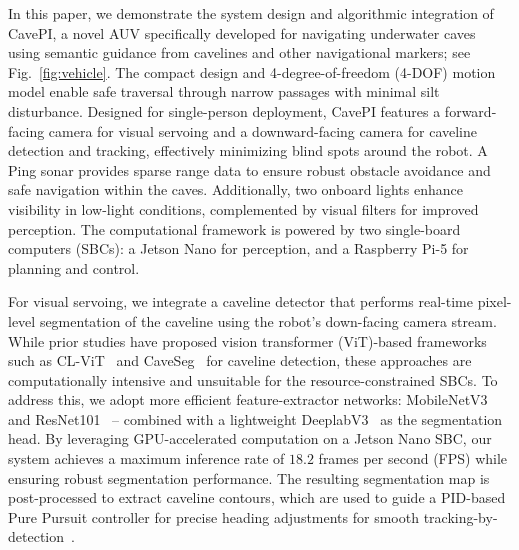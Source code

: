 In this paper, we demonstrate the system design and algorithmic integration of CavePI, a novel AUV specifically developed for navigating underwater caves using semantic guidance from cavelines and other navigational markers; see Fig.~\ref{fig:vehicle}. The compact design and 4-degree-of-freedom (4-DOF) motion model enable safe traversal through narrow passages with minimal silt disturbance. Designed for single-person deployment, CavePI features a forward-facing camera for visual servoing and a downward-facing camera for caveline detection and tracking, effectively minimizing blind spots around the robot. A Ping sonar provides sparse range data to ensure robust obstacle avoidance and safe navigation within the caves. Additionally, two onboard lights enhance visibility in low-light conditions, complemented by visual filters for improved perception. The computational framework is powered by two single-board computers (SBCs): a Jetson Nano for perception, and a Raspberry Pi-5 for planning and control. 



For visual servoing, we integrate a caveline detector that performs real-time pixel-level segmentation of the caveline using the robot's down-facing camera stream. While prior studies have proposed vision transformer (ViT)-based frameworks such as CL-ViT~\cite{yu2023weakly} and CaveSeg~\cite{abdullah2023caveseg} for caveline detection, these approaches are computationally intensive and unsuitable for the resource-constrained SBCs. To address this, we adopt more efficient feature-extractor networks: MobileNetV3~\cite{howard2019searching} and ResNet101~\cite{he2016deep} -- combined with a lightweight DeeplabV3~\cite{chen2017rethinking} as the segmentation head. By leveraging GPU-accelerated computation on a Jetson Nano SBC, our system achieves a maximum inference rate of $18.2$ frames per second (FPS) while ensuring robust segmentation performance. The resulting segmentation map is post-processed to extract caveline contours, which are used to guide a PID-based Pure Pursuit controller for precise heading adjustments for smooth tracking-by-detection~\cite{shkurti2017underwater}.


